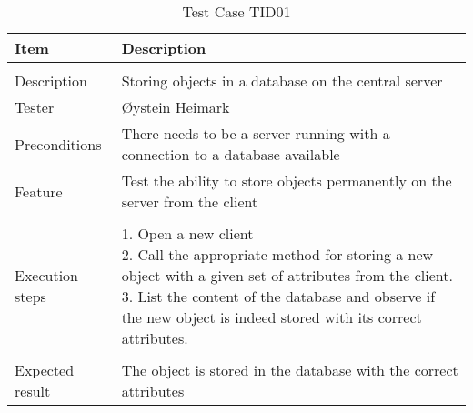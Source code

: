 \begin{table}[H]
\caption{Test Case TID01}
\centering
\begin{tabular}{ l p{13cm} }
\hline 
 Item            & Description                                                              \\ 
\hline \\ [-2.0ex]
 Description     & Storing objects in a database on the central server                        \\ 
 Tester          & Øystein Heimark                  \\ 
 Preconditions   & There needs to be a server running with a connection to a database available \\ 
 Feature         & Test the ability to store objects permanently on the server from the client  \vspace{3pt}                     \\ 
\hline \\ [-1.5ex]
 Execution steps & \pbox{13cm}{1. Open a new client \\ 2. Call the appropriate method for storing a new object with a given set of attributes from the client. \\ 3. List the content of the database and observe if the new object is indeed stored with its correct attributes. } \vspace{3pt} \\
\hline \\ [-1.5ex]
 Expected result & The object is stored in the database with the correct attributes                                          \\
\hline 
\end{tabular}
\label{table:testcasetid01}
\end{table}


